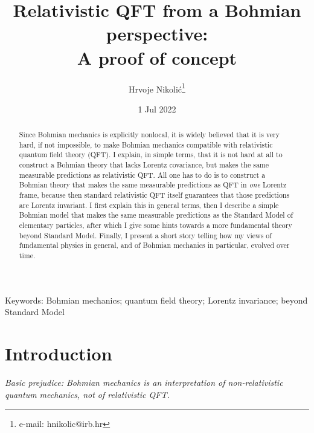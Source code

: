 \documentclass[12pt]{article}
\title{Relativistic QFT from a Bohmian perspective: \\
A proof of concept}
\author{Hrvoje Nikoli\'c\footnote{e-mail: hnikolic@irb.hr}}
\affil{Theoretical Physics Division, Rudjer Bo\v{s}kovi\'{c} Institute, \\
P.O.B. 180, HR-10002 Zagreb, Croatia}
\date{1 Jul 2022}
\begin{document}
\maketitle


\begin{abstract} 
Since Bohmian mechanics is explicitly nonlocal, it is widely believed that it is very hard,  
if not impossible, to make Bohmian mechanics compatible with relativistic quantum field theory (QFT).
I explain, in simple terms, that it is not hard at all to construct a Bohmian theory 
that lacks Lorentz covariance, but makes the same measurable predictions as relativistic QFT.
All one has to do is to construct a Bohmian theory 
that makes the same measurable predictions as QFT in {\em one} Lorentz frame,
because then standard relativistic QFT itself guarantees that those predictions are Lorentz invariant.
I first explain this in general terms, then I describe a simple Bohmian model that makes the same
measurable predictions as the Standard Model of elementary particles, after which I give some hints 
towards a more fundamental theory beyond Standard Model. 
Finally, I present a short story telling how my views of fundamental physics
in general, and of Bohmian mechanics in particular, evolved over time.      
\end{abstract}

\noindent
Keywords: Bohmian mechanics; quantum field theory; Lorentz invariance; beyond Standard Model

\section{Introduction}

\begin{flushright}
{\it Basic prejudice: Bohmian mechanics is an interpretation of non-relativistic quantum mechanics, not of relativistic QFT.}
\end{flushright}
\end{document}
